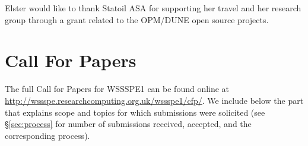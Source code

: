 \documentclass[11pt, oneside]{amsart}
\begin{document}
Elster would like to thank Statoil ASA for supporting her travel
and her research group through a grant related to the OPM/DUNE open source projects.



\appendix

\section{Call For Papers} \label{sec:cfp}

The full Call for Papers for WSSSPE1 can be found online at
\url{http://wssspe.researchcomputing.org.uk/wssspe1/cfp/}. We include
below the part that explains scope and topics for which submissions
were solicited (see \S\ref{sec:process} for number of submissions
received, accepted, and the corresponding process).
\end{document}
